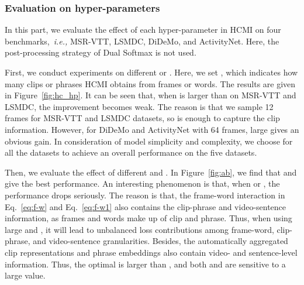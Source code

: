 \documentclass{article}
\begin{document}
\subsubsection{Evaluation on hyper-parameters}
In this part, we evaluate the effect of each hyper-parameter in HCMI on four benchmarks,~\emph{i.e.,} MSR-VTT, LSMDC, DiDeMo, and ActivityNet.
Here, the post-processing strategy of Dual Softmax is not used. 


First, we conduct experiments on different  or .
Here, we set , which indicates how many clips or phrases HCMI obtains from frames or words.
The results are given in Figure~\ref{fig:hc_hp}.
It can be seen that, when  is larger than  on MSR-VTT and LSMDC, the improvement becomes weak.
The reason is that we sample 12 frames for MSR-VTT and LSMDC datasets, so  is enough to capture the clip information.
However, for DiDeMo and ActivityNet with 64 frames, large  gives an obvious gain.
In consideration of model simplicity and complexity, we choose   for all the datasets to achieve an overall performance on the five datasets.


Then, we evaluate the effect of different  and .
In Figure~\ref{fig:ab}, we find that  and  give the best performance.
An interesting phenomenon is that, when  or , the performance drops seriously.
The reason is that, the frame-word interaction in Eq.~\eqref{eq:f-w} and Eq.~\eqref{eq:f-w1} also contains the clip-phrase and video-sentence information, as frames and words make up of clip and phrase.
Thus, when using large  and , it will lead to unbalanced loss contributions among frame-word, clip-phrase, and video-sentence granularities.
Besides, the automatically aggregated clip representations and phrase embeddings also contain video- and sentence-level information.
Thus, the optimal  is larger than , and both  and  are sensitive to a large value.
\end{document}
